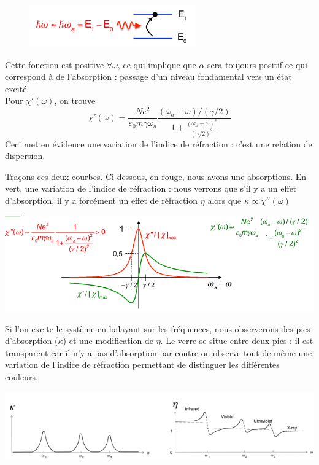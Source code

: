	\begin{figure}
	\vspace{-5mm}
	\includegraphics[scale=0.7]{ch2/image3.png}
	\end{figure}
	Cette fonction est positive $\forall\omega$, ce qui implique que $\alpha$ sera toujours positif ce qui 
	correspond à de l'absorption : passage d'un niveau fondamental vers un état excité.\\
	Pour $\chi'(\omega)$, on trouve
	\begin{equation}
	\chi'(\omega) = \dfrac{Ne^2}{\varepsilon_0m\gamma\omega_a}\dfrac{(\omega_a-\omega)/(\gamma/2)}
	{1+\frac{(\omega_a-\omega)^2}{(\gamma	/2)^2}}
	\end{equation}
	Ceci met en évidence une variation de l'indice de réfraction : c'est une relation de dispersion. 
	
	\newpage
	Traçons ces deux courbes. Ci-dessous, en rouge, nous avons une absorptions. En vert, une variation de
	l'indice de réfraction : nous verrons que s'il y a un effet d’absorption, il y a forcément un effet 
	de réfraction $\eta$ alors que $\kappa \propto \chi''(\omega)$
	\begin{center}
	\includegraphics[scale=0.5]{ch2/image4.png}
	\end{center}	
	Si l'on excite le système en balayant sur les fréquences, nous observerons des pics d'absorption 
	($\kappa$) et une modification de $\eta$. Le verre se situe entre deux pics : il est transparent 
	car il n'y a pas d’absorption par contre on observe tout de même une variation de l'indice de 
	réfraction permettant de distinguer les différentes couleurs.
	\begin{center}
	\includegraphics[scale=0.7]{ch2/image5.png}
	\end{center}	
	
